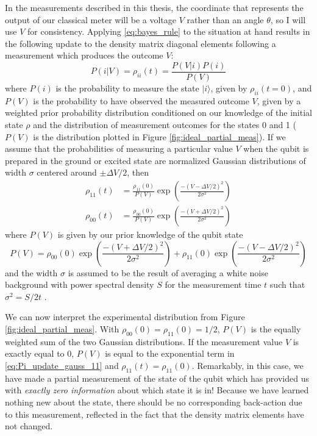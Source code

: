 In the measurements described in this thesis, the coordinate that represents the output of our classical meter will be a voltage $V$ rather than an angle $\theta$, so I will use $V$ for consistency.  Applying \ref{eq:bayes_rule} to the situation at hand results in the following update to the density matrix diagonal elements following a measurement which produces the outcome $V$:
\begin{equation}
P(i|V) = \rho_{ii}(t) = \frac{P(V|i)P(i)}{P(V)}
\label{eq:Pi_update}
\end{equation}
where $P(i)$ is the probability to measure the state $|i\rangle$, given by $\rho_{ii}(t=0)$, and $P(V)$ is the probability to have observed the measured outcome $V$, given by a weighted prior probability distribution conditioned on our knowledge of the initial state $\rho$ and the distribution of measurement outcomes for the states 0 and 1 ($P(V)$ is the distribution plotted in Figure \ref{fig:ideal_partial_meas}).  If we assume that the probabilities of measuring a particular value $V$ when the qubit is prepared in the ground or excited state are normalized Gaussian distributions of width $\sigma$ centered around $\pm \Delta V/2$,  then
\begin{align}
\rho_{11}(t) &= \frac{\rho_{11}(0)}{P(V)}  \exp {\left( \frac{-(V - \Delta V/2)^2}{2\sigma^2} \right)} \label{eq:Pi_update_gauss_11} \\
\rho_{00}(t) &= \frac{\rho_{00}(0)}{P(V)}  \exp \left( \frac{-(V + \Delta V/2)^2}{2\sigma^2} \right)
\label{eq:Pi_update_gauss_00}
\end{align}
where $P(V)$ is given by our prior knowledge of the qubit state
\begin{equation}
P(V) = \rho_{00}(0)  \exp{\left( \frac{-(V + \Delta V/2)^2}{2\sigma^2} \right)} + \rho_{11}(0) \exp{\left( \frac{-(V - \Delta V/2)^2}{2\sigma^2} \right)}
\end{equation}
and the width $\sigma$ is assumed to be the result of averaging a white noise background with power spectral density $S$ for the measurement time $t$ such that $\sigma^2 = S/2t$ \cite{koro11}.

We can now interpret the experimental distribution from Figure \ref{fig:ideal_partial_meas}.  With $\rho_{00}(0) = \rho_{11}(0) = 1/2$, $P(V)$ is the equally weighted sum of the two Gaussian distributions.  If the measurement value $V$ is exactly equal to 0, $P(V)$ is equal to the exponential term in \eqref{eq:Pi_update_gauss_11} and $\rho_{11}(t) = \rho_{11}(0)$.  Remarkably, in this case, we have made a partial measurement of the state of the qubit which has provided us with \textit{exactly zero information} about which state it is in!  Because we have learned nothing new about the state, there should be no corresponding back-action due to this measurement, reflected in the fact that the density matrix elements have not changed.

